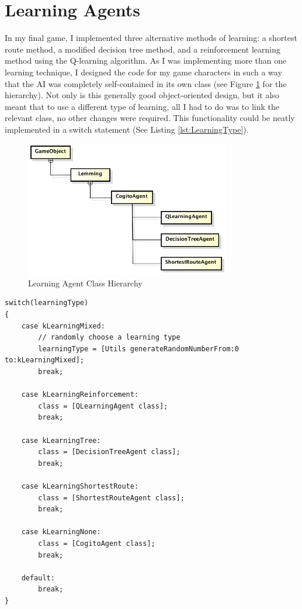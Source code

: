 \documentclass[a4paper,oneside]{report}
\begin{document}
\section{Learning Agents}

In my final game, I implemented three alternative methods of learning: a shortest route method, a modified decision tree method, and a reinforcement learning method using the Q-learning algorithm. As I was implementing more than one learning technique, I designed the code for my game characters in such a way that the AI was completely self-contained in its own class (see Figure \ref{fig:AgentHierarchy} for the hierarchy). Not only is this generally good object-oriented design, but it also meant that to use a different type of learning, all I had to do was to link the relevant class, no other changes were required. This functionality could be neatly implemented in a switch statement (See Listing \ref{lst:LearningType}).

\begin{figure}[H]
  \centering
    \includegraphics[width=90mm]{sources/images/GameObject}
    \caption{Learning Agent Class Hierarchy}
    \label{fig:AgentHierarchy}
\end{figure}

\begin{lstlisting}[label={lst:LearningType},caption=Switch Statement for Setting Learning Type]
switch(learningType) 
{                
	case kLearningMixed:
    	// randomly choose a learning type
        learningType = [Utils generateRandomNumberFrom:0 to:kLearningMixed]; 
        break;
                
    case kLearningReinforcement:
        class = [QLearningAgent class];
        break;
                
    case kLearningTree:
        class = [DecisionTreeAgent class];
        break;
                
    case kLearningShortestRoute:
        class = [ShortestRouteAgent class];
        break;
         
    case kLearningNone:
        class = [CogitoAgent class];
        break;
                
    default:
        break;
}
\end{lstlisting}
\end{document}

